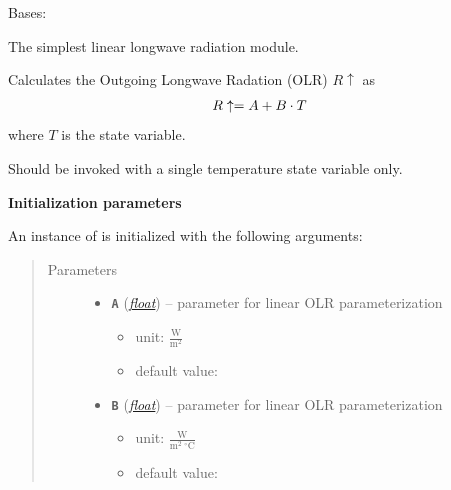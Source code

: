 \documentclass[letterpaper,10pt,english]{sphinxmanual}
\begin{document}
\begin{fulllineitems}
\label{api/climlab.radiation:climlab.radiation.AplusBT.AplusBT}
Bases: {\hyperref[api/climlab.process:climlab.process.energy_budget.EnergyBudget]{\emph{}}}

The simplest linear longwave radiation module.

Calculates the Outgoing Longwave Radation (OLR) \(R\uparrow\) as
\begin{gather}
\begin{split}R\uparrow = A + B \cdot T\end{split}\notag
\end{gather}
where \(T\) is the state variable.

Should be invoked with a single temperature state variable only.

\textbf{Initialization parameters}

An instance of  is initialized with the following 
arguments:
\begin{quote}\begin{description}
\item[{Parameters}] \leavevmode\begin{itemize}
\item {} 
\textbf{\texttt{A}} (\href{http://docs.python.org/2.7/library/functions.html\#float}{\emph{float}}) -- 
parameter for linear OLR parameterization
\begin{itemize}
\item {} 
unit: \(\frac{\textrm{W}}
{\textrm{m}^2}\)

\item {} 
default value: 

\end{itemize}


\item {} 
\textbf{\texttt{B}} (\href{http://docs.python.org/2.7/library/functions.html\#float}{\emph{float}}) -- 
parameter for linear OLR parameterization
\begin{itemize}
\item {} 
unit: \(\frac{\textrm{W}}
{\textrm{m}^2 \ ^{\circ} \textrm{C}}\)

\item {} 
default value: 

\end{itemize}



\end{itemize}
\end{description}
\end{quote}
\end{fulllineitems}
\end{document}
